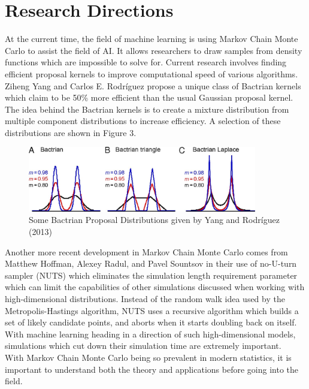 \documentclass[10pt]{article}
\begin{document}
\section{Research Directions}
At the current time, the field of machine learning is using Markov Chain Monte Carlo to assist the field of AI. It allows researchers to draw samples from density functions which are impossible to solve for. Current research involves finding efficient proposal kernels to improve computational speed of various algorithms. Ziheng Yang and Carlos E. Rodríguez \cite{ziheng} propose a unique class of Bactrian kernels which claim to be 50\% more efficient than the usual Gaussian proposal kernel. The idea behind the Bactrian kernels is to create a mixture distribution from multiple component distributions to increase efficiency. A selection of these distributions are shown in Figure 3.

\begin{figure}[h]
    \centering
    \includegraphics[width=100mm,scale=0.5]{Figure3.jpeg}
    \caption{Some Bactrian Proposal Distributions given by Yang and Rodríguez (2013)} 
    \label{fig:my_label}
\end{figure}

\noindent
Another more recent development in Markov Chain Monte Carlo comes from Matthew Hoffman, Alexey Radul, and Pavel Sountsov \cite{hoff} in their use of no-U-turn sampler (NUTS) which eliminates the simulation length requirement parameter which can limit the capabilities of other simulations discussed when working with high-dimensional distributions. Instead of the random walk idea used by the Metropolis-Hastings algorithm, NUTS uses a recursive algorithm which builds a set of likely candidate points, and aborts when it starts doubling back on itself. With machine learning heading in a direction of such high-dimensional models, simulations which cut down their simulation time are extremely important.
\\[1\baselineskip]
\noindent
With Markov Chain Monte Carlo being so prevalent in modern statistics, it is important to understand both the theory and applications before going into the field.
\pagebreak
\end{document}
